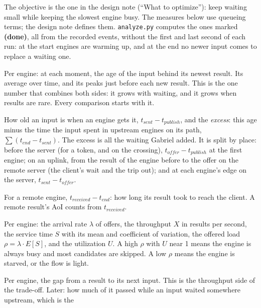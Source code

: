 \documentclass[11pt]{article}
\newcommand{\code}[1]{\texttt{#1}}
\begin{document}
The objective is the one in the design note (``What to optimize''): keep
waiting small while keeping the slowest engine busy. The measures below use
queueing terms; the design note defines them. \code{analyze.py} computes the
ones marked \textbf{(done)}, all from the recorded events, without the first
and last second of each run: at the start engines are warming up, and at the
end no newer input comes to replace a waiting one.
\begin{description}[style=nextline, leftmargin=1.5em]
  \item[Age of information (AoI) (done)] Per engine: at each moment, the age
        of the input behind its newest result. Its average over time, and its
        peaks just before each new result. This is the one number that
        combines both sides: it grows with waiting, and it grows when results
        are rare. Every comparison starts with it.
  \item[Waiting (done)] How old an input is when an engine gets it,
        $t_\mathit{sent} - t_\mathit{publish}$, and the \emph{excess}: this
        age minus the time the input spent in upstream engines on its path,
        $\sum (t_\mathit{end} - t_\mathit{sent})$. The excess is all the
        waiting Gabriel added. It is split by place: before the server (for a
        token, and on the crossing), $t_\mathit{offer} - t_\mathit{publish}$
        at the first engine; on an uplink, from the result of the engine
        before to the offer on the remote server (the client's wait and the
        trip out); and at each engine's edge on the server,
        $t_\mathit{sent} - t_\mathit{offer}$.
  \item[Return trip (done)] For a remote engine, $t_\mathit{received} -
        t_\mathit{end}$: how long its result took to reach the client. A
        remote result's AoI counts from $t_\mathit{received}$.
  \item[Load (done)] Per engine: the arrival rate $\lambda$ of offers, the
        throughput $X$ in results per second, the service time $S$ with its
        mean and coefficient of variation, the offered load $\rho = \lambda
        \cdot E[S]$, and the utilization $U$. A high $\rho$ with $U$ near 1
        means the engine is always busy and most candidates are skipped. A
        low $\rho$ means the engine is starved, or the flow is light.
  \item[Idle time (done)] Per engine, the gap from a result to its next
        input. This is the throughput side of the trade-off. Later: how much
        of it passed while an input waited somewhere upstream, which is the

\end{description}
\end{document}
